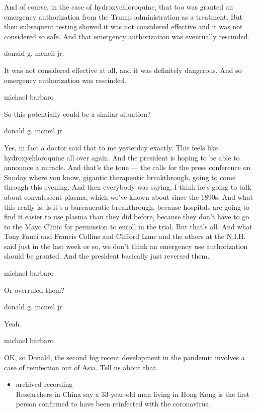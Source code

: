 And of course, in the case of hydroxychloroquine, that too was granted
an emergency authorization from the Trump administration as a treatment.
But then subsequent testing showed it was not considered effective and
it was not considered so safe. And that emergency authorization was
eventually rescinded.

donald g. mcneil jr.

It was not considered effective at all, and it was definitely dangerous.
And so emergency authorization was rescinded.

michael barbaro

So this potentially could be a similar situation?

donald g. mcneil jr.

Yes, in fact a doctor said that to me yesterday exactly. This feels like
hydroxychloroquine all over again. And the president is hoping to be
able to announce a miracle. And that's the tone --- the calls for the
press conference on Sunday where you know, gigantic therapeutic
breakthrough, going to come through this evening. And then everybody was
saying, I think he's going to talk about convalescent plasma, which
we've known about since the 1890s. And what this really is, is it's a
bureaucratic breakthrough, because hospitals are going to find it easier
to use plasma than they did before, because they don't have to go to the
Mayo Clinic for permission to enroll in the trial. But that's all. And
what Tony Fauci and Francis Collins and Clifford Lane and the others at
the N.I.H. said just in the last week or so, we don't think an emergency
use authorization should be granted. And the president basically just
reversed them.

michael barbaro

Or overruled them?

donald g. mcneil jr.

Yeah.

michael barbaro

OK, so Donald, the second big recent development in the pandemic
involves a case of reinfection out of Asia. Tell us about that.

\begin{itemize}
\tightlist
\item
  archived recording\\
  Researchers in China say a 33-year-old man living in Hong Kong is the
  first person confirmed to have been reinfected with the coronavirus.
\end{itemize}

